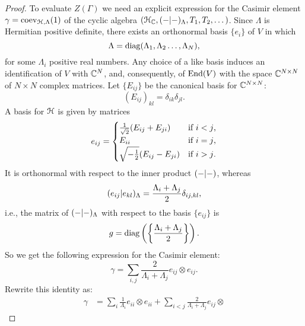 \begin{proof}
  To evaluate $Z(\Gamma)$ we need an explicit expression for the
  Casimir element $\gamma = \coev_{\Hermitian[N],\Lambda}(1)$ of the cyclic
  algebra $(\Hermitian[N]_\setC, \inner[\Lambda]{-}{-}, T_1, T_2,
  \dots)$.  Since $\Lambda$ is Hermitian positive definite, there
  exists an orthonormal basis $\{e_i\}$ of $V$ in which
  \begin{equation*}
    \Lambda=\diag(\Lambda_1,\Lambda_2\dots,\Lambda_N),
  \end{equation*}
  for some $\Lambda_i$ positive real numbers. Any choice of a like basis
  induces an identification of $V$ with $\setC^N$, and, consequently,
  of $\End(V)$ with the space $\setC^{N\times N}$ of $N \times N$ complex
  matrices. Let $\{E_{ij}\}$ be the canonical basis for $\setC^{N\times N}$:
  \begin{equation*}
    (E_{ij})_{kl}=\delta_{ik}\delta_{jl}. 
  \end{equation*}
  A basis for $\Hermitian[N]$ is given by matrices
  \begin{equation*}
    e_{ij}=\begin{cases}
      \frac{1}{\sqrt{2}} (E_{ij}+E_{ji}) &\text{if $i<j$,}\\
      E_{ii}                             &\text{if $i=j$,}\\
      \sqrt{-\onehalf} (E_{ij}-E_{ji})   &\text{if $i>j$.} 
    \end{cases}
  \end{equation*}
  It is orthonormal with respect to the inner product
  $\inner{-}{-}$, whereas 
  \begin{equation*}
    \inner[\Lambda]{e_{ij}}{e_{kl}}
    = \frac{\Lambda_i + \Lambda_j}{2} \delta_{ij,kl},
  \end{equation*}
  i.e., the matrix of $\inner[\Lambda]{-}{-}$ with respect to the
  basis $\{e_{ij}\}$ is
  \begin{equation*}
    g = \diag\left(\left\{ \frac{\Lambda_i + \Lambda_j}{2}
      \right\}\right). 
  \end{equation*}
  So we get the following expression for the Casimir element:
  \begin{equation*}
    \gamma = \sum_{i,j} \frac{2}{\Lambda_i+\Lambda_j} e_{ij} \otimes e_{ij}. 
  \end{equation*}
  Rewrite this identity as:
  \begin{align*}
    \gamma &=\sum_{i}\frac{1}{{\Lambda_i}}e_{ii}\otimes
    e_{ii}+\sum_{i<j}\frac{2}{{\Lambda_i+\Lambda_j}}e_{ij}\otimes

\end{align*}
\end{proof}
